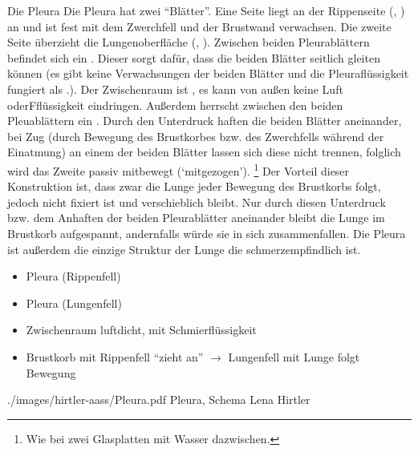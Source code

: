 \begin{Synopsis}
\end{Synopsis}


\clearpage%

\TextSlidePicture
{Die Pleura}%
{%
\label{topic:pleura}%
%
%
%
%
Die Pleura hat zwei \protect\enquote{Blätter}. 
%
Eine Seite 
liegt an der Rippenseite 
(, ) 
an 
und ist fest mit dem Zwerchfell und der Brustwand verwachsen. 
%
Die zweite Seite  über\-zieht die Lungenoberfläche
(, ).
%
Zwischen beiden Pleurablättern befindet sich ein . 
%
Dieser sorgt dafür, 
dass die beiden Blätter seitlich gleiten können 
(es gibt keine Verwachsungen der beiden Blätter 
und die Pleuraflüssigkeit fungiert als .).
%
Der Zwischenraum ist , 
es kann von außen keine Luft oderFflüssigkeit eindringen. 
%
Außerdem herrscht zwischen den beiden Pleuablättern ein 
.
% 
%
Durch den Unterdruck haften die beiden Blätter aneinander, 
bei Zug 
(durch Bewegung des Brustkorbes bzw. des Zwerchfells während der Einatmung)
an einem der beiden Blätter lassen sich diese nicht trennen,
folglich wird das Zweite passiv mitbewegt (\enquote*{mitgezogen}).%
\footnote{Wie bei zwei Glasplatten mit Wasser dazwischen.} 
%
Der Vorteil dieser Konstruktion ist, 
dass zwar die Lunge jeder Bewegung des Brustkorbs folgt, 
jedoch nicht fixiert ist
und verschieblich bleibt.
%
Nur durch diesen Unterdruck 
bzw. dem Anhaften der beiden Pleurablätter aneinander 
bleibt die Lunge im Brustkorb aufgespannt, 
andernfalls würde sie in sich zusammenfallen.
%
Die Pleura ist außer\-dem die einzige Struktur der Lunge 
die schmerzempfindlich ist.
}%
{
\begin{itemize}
    \item {} Pleura (Rippenfell)
    \item {} Pleura (Lungenfell)
    \item Zwischenraum luftdicht, mit Schmierflüssigkeit
    \item Brustkorb mit Rippenfell \protect\enquote{zieht an} 
    $\rightarrow$ 
    Lungenfell mit Lunge folgt     Bewegung     
\end{itemize}}%
{./images/hirtler-aass/Pleura.pdf}%
{Pleura, Schema}%
{}%
{Lena Hirtler}%
{}%


